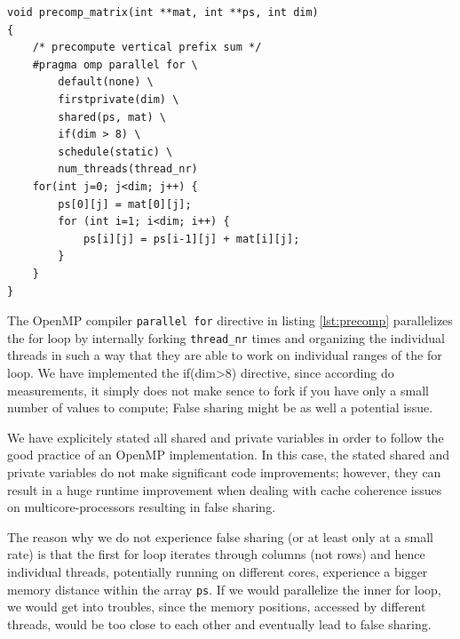 \documentclass[conference]{IEEEtran}
\begin{document}
\begin{center}
   \begin{lstlisting}[captionpos=b, caption=OpenMP: Parallel Matrix Pre-Computation of the Vertical Sum, label=lst:precomp]                                            
void precomp_matrix(int **mat, int **ps, int dim)                                  
{                                             
    /* precompute vertical prefix sum */  
    #pragma omp parallel for \ 
        default(none) \        
        firstprivate(dim) \    
        shared(ps, mat) \      
        if(dim > 8) \          
        schedule(static) \     
        num_threads(thread_nr)     
    for(int j=0; j<dim; j++) {                
        ps[0][j] = mat[0][j];                 
        for (int i=1; i<dim; i++) {           
            ps[i][j] = ps[i-1][j] + mat[i][j];
        }                                     
    }                                         
}                                             
   \end{lstlisting}
\end{center}

The OpenMP compiler \texttt{parallel for} directive in listing \ref{lst:precomp} parallelizes the for loop by internally forking \texttt{thread\_nr} times and organizing the individual threads in such a way that they are able to work on individual ranges of the for loop. We have implemented the if(dim>8) directive, since according do measurements, it simply does not make sence to fork if you have only a small number of values to compute; False sharing might be as well a potential issue. 

We have explicitely stated all shared and private variables in order to follow the good practice of an OpenMP implementation. In this case, the stated shared and private variables do not make significant code improvements; however, they can result in a huge runtime improvement when dealing with cache coherence issues on multicore-processors resulting in false sharing. 

The reason why we do not experience false sharing (or at least only at a small rate) is that the first for loop iterates through columns (not rows) and hence individual threads, potentially running on different cores, experience a bigger memory distance within the array \texttt{ps}. If we would parallelize the inner for loop, we would get into troubles, since the memory positions, accessed by different threads, would be too close to each other and eventually lead to false sharing. 
\end{document}
